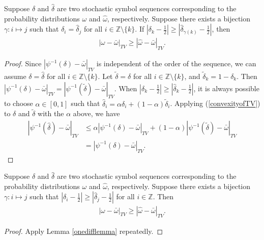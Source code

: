 \documentclass[final]{siamltex}
\begin{document}
\begin{lemma}
  \label{onedifflemma} Suppose $\delta$ and $\hat{\delta}$ are two
  stochastic symbol sequences corresponding to the probability
  distributions $\omega$ and $\hat{\omega}$, respectively. Suppose
  there exists a bijection $\gamma: i \mapsto j$ such that $\delta_i =
  \hat{\delta}_j$ for all $i\in \mathbb{Z}\setminus\{k\}$. If
  $ |\delta_{k}-\frac{1}{2}| \ge
  |\hat{\delta}_{\gamma(k)}-\frac{1}{2}|$, then
 \begin{align}
      |\omega-\bar{\omega} |_{TV} \ge |\hat{\omega}-\bar{\omega} |_{TV}.
 \end{align}
\end{lemma}
\begin{proof}
  Since $|\psi^{-1}(\delta)-\bar{\omega}|_{TV}$ is independent of the
  order of the sequence, we can assume $\delta = \hat{\delta}$ for all
  $i\in \mathbb{Z}\setminus\{k\}$. Let $\tilde{\delta} =
  \delta$ for all $i\in \mathbb{Z}\setminus\{k\}$, and
  $\tilde{\delta}_{k}=1-\delta_{k}$. Then
  $|\psi^{-1}(\delta)-\bar{\omega}|_{TV}
  =|\psi^{-1}(\tilde{\delta})-\bar{\omega}|_{TV} $. When
  $|\delta_{k}-\frac{1}{2}| \ge
  |\hat{\delta}_{k}-\frac{1}{2}|$, it is always possible to
  choose $\alpha\in[0,1]$ such that $\hat{\delta}_i = \alpha \delta_i
  +(1-\alpha) \tilde{\delta}_i $.  Applying (\ref{convexityofTV}) to
  $\delta$ and $\tilde{\delta}$ with the $\alpha$ above, we have
  \begin{align*}
    |\psi^{-1}(\hat{\delta})-\bar{\omega}|_{TV}
    &\le  \alpha|\psi^{-1}(\delta)-\bar{\omega}
    |_{TV}+(1-\alpha)|\psi^{-1}(\tilde{\delta})-\bar{\omega}|_{TV} \\
    & = |\psi^{-1}(\delta)-\bar{\omega} |_{TV}.
  \end{align*}
\end{proof}

\begin{lemma}
  \label{alldifflemma} Suppose $\delta$ and $\hat{\delta}$ are two
  stochastic symbol sequences corresponding to the probability
  distributions $\omega$ and $\hat{\omega}$, respectively. Suppose
  there exists a bijection $\gamma: i \mapsto j$ such that
  $|\delta_i-\frac{1}{2}| \ge |\hat{\delta}_j-\frac{1}{2} |$ for all
  $i\in \mathbb{Z}$. Then
  \begin{align}
    |\omega-\bar{\omega} |_{TV} \ge|\hat{\omega}-\bar{\omega} |_{TV}.
  \end{align}
\end{lemma}
\begin{proof} Apply Lemma \ref{onedifflemma} repeatedly.
\end{proof}
\end{document}
